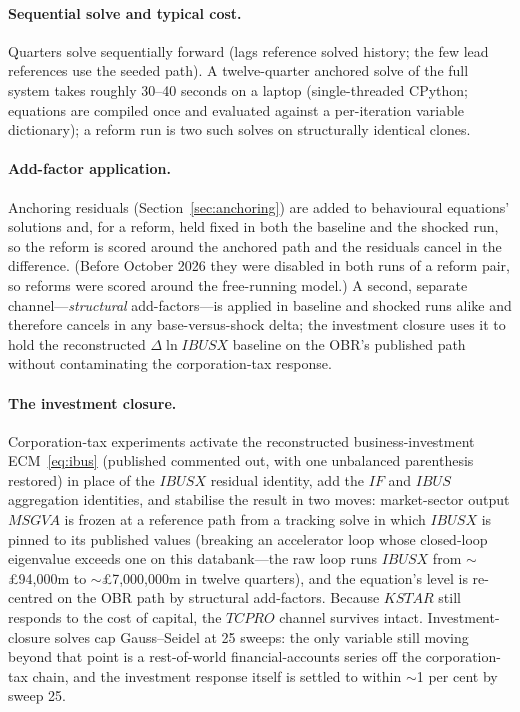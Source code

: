 \paragraph{Sequential solve and typical cost.} Quarters solve sequentially forward (lags reference solved history; the few lead references use the seeded path). A twelve-quarter anchored solve of the full system takes roughly 30--40 seconds on a laptop (single-threaded CPython; equations are compiled once and evaluated against a per-iteration variable dictionary); a reform run is two such solves on structurally identical clones.

\paragraph{Add-factor application.} Anchoring residuals (Section~\ref{sec:anchoring}) are added to behavioural equations' solutions and, for a reform, held fixed in both the baseline and the shocked run, so the reform is scored around the anchored path and the residuals cancel in the difference. (Before October 2026 they were disabled in both runs of a reform pair, so reforms were scored around the free-running model.) A second, separate channel---\emph{structural} add-factors---is applied in baseline and shocked runs alike and therefore cancels in any base-versus-shock delta; the investment closure uses it to hold the reconstructed $\Delta \ln IBUSX$ baseline on the OBR's published path without contaminating the corporation-tax response.

\paragraph{The investment closure.} Corporation-tax experiments activate the reconstructed business-investment ECM~\eqref{eq:ibus} (published commented out, with one unbalanced parenthesis restored) in place of the $IBUSX$ residual identity, add the $IF$ and $IBUS$ aggregation identities, and stabilise the result in two moves: market-sector output $MSGVA$ is frozen at a reference path from a tracking solve in which $IBUSX$ is pinned to its published values (breaking an accelerator loop whose closed-loop eigenvalue exceeds one on this databank---the raw loop runs $IBUSX$ from $\sim$\pounds 94{,}000m to $\sim$\pounds 7{,}000{,}000m in twelve quarters), and the equation's level is re-centred on the OBR path by structural add-factors. Because $KSTAR$ still responds to the cost of capital, the $TCPRO$ channel survives intact. Investment-closure solves cap Gauss--Seidel at 25 sweeps: the only variable still moving beyond that point is a rest-of-world financial-accounts series off the corporation-tax chain, and the investment response itself is settled to within $\sim$1 per cent by sweep 25.

